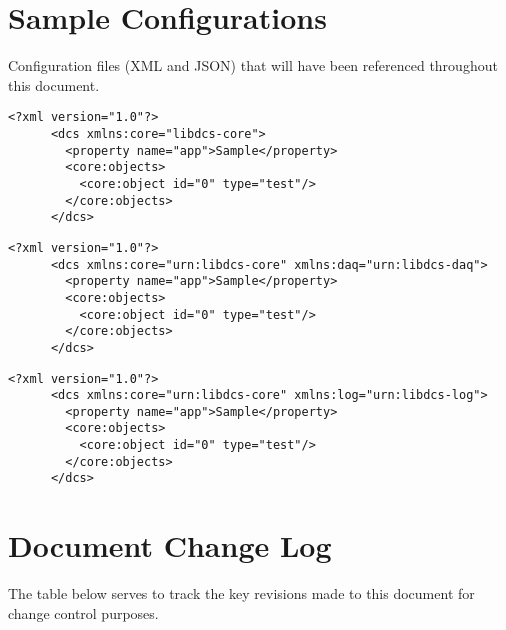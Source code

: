 \documentclass[11pt]{article}
\begin{document}
  \newpage

  \section{Sample Configurations}\label{app:configurations}

    Configuration files (XML and JSON) that will have been referenced throughout
    this document.

    \begin{lstlisting}[caption={Complete Core Sample},label={lst:full-core}]
      <?xml version="1.0"?>
      <dcs xmlns:core="libdcs-core">
        <property name="app">Sample</property>
        <core:objects>
          <core:object id="0" type="test"/>
        </core:objects>
      </dcs>
    \end{lstlisting}

    \begin{lstlisting}[caption={Complete DAQ Sample},label={lst:full-daq}]
      <?xml version="1.0"?>
      <dcs xmlns:core="urn:libdcs-core" xmlns:daq="urn:libdcs-daq">
        <property name="app">Sample</property>
        <core:objects>
          <core:object id="0" type="test"/>
        </core:objects>
      </dcs>
    \end{lstlisting}

    \begin{lstlisting}[caption={Complete Log Sample},label={lst:full-log}]
      <?xml version="1.0"?>
      <dcs xmlns:core="urn:libdcs-core" xmlns:log="urn:libdcs-log">
        <property name="app">Sample</property>
        <core:objects>
          <core:object id="0" type="test"/>
        </core:objects>
      </dcs>
    \end{lstlisting}

  \newpage

  \section{Document Change Log}\label{app:changelog}

    The table below serves to track the key revisions made to this document for
    change control purposes.

    \begin{versionhistory}
    \end{versionhistory}
\end{document}
